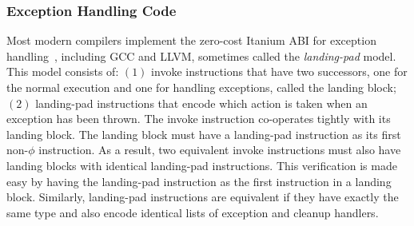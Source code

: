 \subsubsection*{Exception Handling Code}


Most modern compilers implement the zero-cost Itanium ABI for exception
handling~\cite{dinechin00}, including GCC and LLVM, sometimes called the
\textit{landing-pad} model.
This model consists of:
$(1)$ invoke instructions that have two successors, one for the normal execution and
one for handling exceptions, called the landing block;
$(2)$ landing-pad instructions that encode which action is taken when an exception has
been thrown.
The invoke instruction co-operates tightly with its landing block.
The landing block must have a landing-pad instruction as its first non-$\phi$
instruction.
As a result, two equivalent invoke instructions must also have landing blocks
with identical landing-pad instructions.
This verification is made easy by having the landing-pad instruction as the first
instruction in a landing block.
Similarly, landing-pad instructions are equivalent if they have exactly the same
type and also encode identical lists of exception and cleanup handlers.



